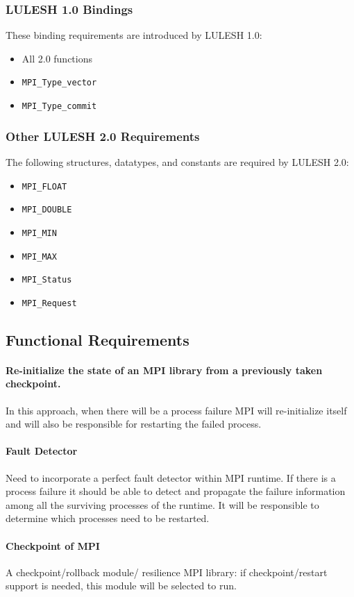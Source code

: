 \documentclass{article}
\newcommand{\itemtt}[1]{\item \texttt{#1}}
\begin{document}
\subsubsection{LULESH 1.0 Bindings}

These binding requirements are introduced by LULESH 1.0:
\begin{itemize}
\item All 2.0 functions
\itemtt{MPI\_Type\_vector}
\itemtt{MPI\_Type\_commit}
\end{itemize}

\subsubsection{Other LULESH 2.0 Requirements}

The following structures, datatypes, and constants are required by LULESH 2.0:

\begin{itemize}
\itemtt{MPI\_FLOAT}
\itemtt{MPI\_DOUBLE}
\itemtt{MPI\_MIN}
\itemtt{MPI\_MAX}
\itemtt{MPI\_Status}
\itemtt{MPI\_Request}
\end{itemize}

\subsection{Functional Requirements}

\paragraph{Re-initialize the state of an MPI library from a previously taken checkpoint.}

In this approach, when there will be a process failure MPI will re-initialize itself and 
	will also be responsible for restarting the failed process.
	
\paragraph{Fault Detector}
	Need to incorporate a perfect fault detector within MPI runtime. If there is a process failure it should be able to detect and  propagate the failure information among all the surviving processes of the runtime.  It will be responsible to determine which processes need to be restarted.
	
\paragraph{Checkpoint of MPI}
	A checkpoint/rollback module/ resilience MPI library: if checkpoint/restart support is needed, this module will be selected to run.
	
\end{document}
